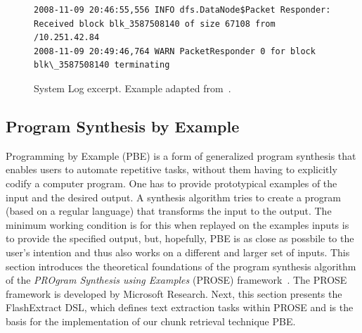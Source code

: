 \begin{figure}[!t]
  \centering
  \begin{lstlisting}[breaklines=true]
2008-11-09 20:46:55,556 INFO dfs.DataNode$Packet Responder: Received block blk_3587508140 of size 67108 from /10.251.42.84
2008-11-09 20:49:46,764 WARN PacketResponder 0 for block blk\_3587508140 terminating
  \end{lstlisting}  
  \caption{System Log excerpt. Example adapted from~\cite{he2017towards}.}
  \label{lst:system-log}
\end{figure}

\subsection{Program Synthesis by Example}
\label{sec:rw-prose}

Programming by Example (PBE) is a form of generalized program
synthesis that enables users to automate repetitive tasks, without
them having to explicitly codify a computer program. One has to
provide prototypical examples of the input and the desired output. A
synthesis algorithm tries to create a program (based on a regular
language) that transforms the input to the output. The minimum working
condition is for this when replayed on the examples inputs is to
provide the specified output, but, hopefully, PBE is as close as
possbile to the user's intention and thus also works on a different
and larger set of inputs. This section introduces the theoretical
foundations of the program synthesis algorithm of the \emph{PROgram
Synthesis using Examples} (PROSE) framework~\cite{prose2019webpage}.
The PROSE framework is developed by Microsoft Research. Next, this
section presents the FlashExtract DSL, which defines text extraction
tasks within PROSE and is the basis for the implementation of our
chunk retrieval technique PBE\@.

